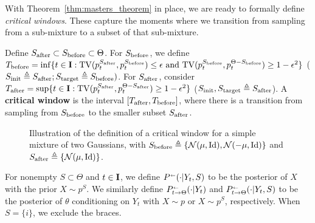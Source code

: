 With Theorem~\ref{thm:masters_theorem} in place, we are ready to formally define \emph{critical windows}. These capture the moments where we transition from sampling from a sub-mixture to a subset of that sub-mixture.
\begin{definition}
Define $S_{\mathrm{after}} \subset S_{\mathrm{before}} \subset \Theta$. For $S_{\mathrm{before}}$, we define $T_{\mathrm{before}} =\inf\{t \in \mathbf{I}:\mathrm{TV}(p_t^{S_{\mathrm{after}}},p_t^{S_{\mathrm{before}}}) \leq \epsilon \text{ and } \mathrm{TV}(p_t^{S_{\mathrm{before}}},p_t^{\Theta-S_{\mathrm{before}}})\geq 1- \epsilon^2\}$ ($S_{\mathrm{init}}\triangleq S_{\mathrm{after}};S_{\mathrm{target}}\triangleq S_{\mathrm{before}})$. For $S_{\mathrm{after}}$, consider $T_{\mathrm{after}} = \sup \{t \in \mathbf{I}:\mathrm{TV}(p_t^{S_{\mathrm{after}}},p_t^{\Theta-S_{\mathrm{after}}}) \geq 1-\epsilon^2\}$ ($S_{\mathrm{init}},S_{\mathrm{target}}\triangleq S_{\mathrm{after}}$). A \textbf{critical window} is the interval $[T_{\mathrm{after}},T_{\mathrm{before}}]$, where there is a transition from sampling from $S_{\mathrm{before}}$ to the smaller subset $S_{\mathrm{after}}$. 
\end{definition}
\begin{figure}[H]
\centering
{}
\caption{Illustration of the definition of a critical window for a simple mixture of two Gaussians, with $S_{\mathrm{before}}\triangleq\{\mathcal{N}(\mu,\mathrm{Id}),\mathcal{N}(-\mu,\mathrm{Id})\}$ and $S_{\mathrm{after}}\triangleq\{\mathcal{N}(\mu,\mathrm{Id})\}$.}
\label{fig:cw_definition}
\end{figure}
For nonempty $S \subset \Theta$ and $t \in \mathbf{I}$, we define $\kernelreverse[](\cdot |Y_t,S)$ to be the posterior of $X$ with the prior $X \sim p^S$. We similarly define $\kernelreverse[]_{t \to \Theta}(\cdot | Y_t)$ and $\kernelreverse[]_{t \to \Theta}(\cdot | Y_t,S)$ to be the posterior of $\theta$ conditioning on $Y_{t}$ with $X \sim p$ or $X \sim p^S$, respectively. When $S=\{i\}$, we exclude the braces.
